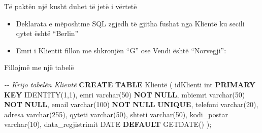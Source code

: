 \documentclass[
  ignorenonframetext,
]{beamer}
\newenvironment{Shaded}{\begin{snugshade}}{\end{snugshade}}
\newcommand{\CommentTok}[1]{\textcolor[rgb]{0.56,0.35,0.01}{\textit{#1}}}
\newcommand{\DataTypeTok}[1]{\textcolor[rgb]{0.13,0.29,0.53}{#1}}
\newcommand{\DecValTok}[1]{\textcolor[rgb]{0.00,0.00,0.81}{#1}}
\newcommand{\KeywordTok}[1]{\textcolor[rgb]{0.13,0.29,0.53}{\textbf{#1}}}
\newcommand{\NormalTok}[1]{#1}
\begin{document}
\begin{frame}{Të paktën një kusht duhet të jetë i vërtetë}
\label{tuxeb-paktuxebn-njuxeb-kusht-duhet-tuxeb-jetuxeb-i-vuxebrtetuxeb}
\begin{itemize}
\item
  Deklarata e mëposhtme SQL zgjedh të gjitha fushat nga Klientë ku
  secili qytet është ``Berlin''
\item
  Emri i Klientit fillon me shkronjën ``G'' ose Vendi është
  ``Norvegji'':
\end{itemize}
\end{frame}

\begin{frame}[fragile]{Fillojmë me një tabelë}
\label{fillojmuxeb-me-njuxeb-tabeluxeb-8}

\begin{Shaded}
\begin{Highlighting}[]
\CommentTok{{-}{-} Krijo tabelën Klientë}
\KeywordTok{CREATE} \KeywordTok{TABLE}\NormalTok{ Klientë (}
\NormalTok{  idKlienti }\DataTypeTok{int} \KeywordTok{PRIMARY} \KeywordTok{KEY}\NormalTok{ IDENTITY(}\DecValTok{1}\NormalTok{,}\DecValTok{1}\NormalTok{),}
\NormalTok{  emri }\DataTypeTok{varchar}\NormalTok{(}\DecValTok{50}\NormalTok{) }\KeywordTok{NOT} \KeywordTok{NULL}\NormalTok{,}
\NormalTok{  mbiemri }\DataTypeTok{varchar}\NormalTok{(}\DecValTok{50}\NormalTok{) }\KeywordTok{NOT} \KeywordTok{NULL}\NormalTok{,}
\NormalTok{  email }\DataTypeTok{varchar}\NormalTok{(}\DecValTok{100}\NormalTok{) }\KeywordTok{NOT} \KeywordTok{NULL} \KeywordTok{UNIQUE}\NormalTok{,}
\NormalTok{  telefoni }\DataTypeTok{varchar}\NormalTok{(}\DecValTok{20}\NormalTok{),}
\NormalTok{  adresa }\DataTypeTok{varchar}\NormalTok{(}\DecValTok{255}\NormalTok{),}
\NormalTok{  qyteti }\DataTypeTok{varchar}\NormalTok{(}\DecValTok{50}\NormalTok{),}
\NormalTok{  shteti }\DataTypeTok{varchar}\NormalTok{(}\DecValTok{50}\NormalTok{),}
\NormalTok{  kodi\_postar }\DataTypeTok{varchar}\NormalTok{(}\DecValTok{10}\NormalTok{),}
\NormalTok{  data\_regjistrimit }\DataTypeTok{DATE} \KeywordTok{DEFAULT}\NormalTok{ GETDATE()}
\NormalTok{);}
\end{Highlighting}
\end{Shaded}
\end{frame}
\end{document}
